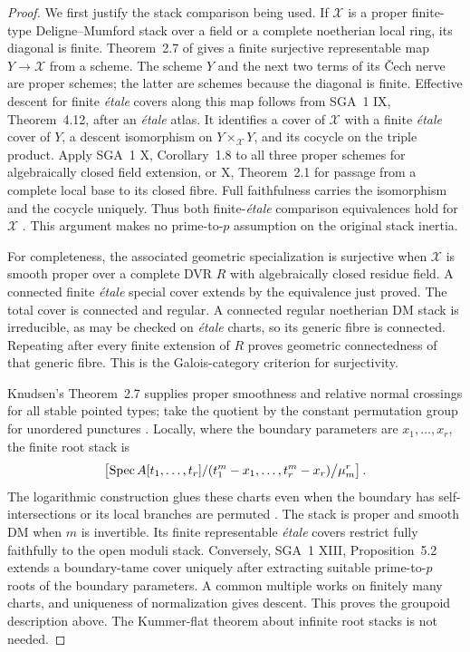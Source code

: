 \begin{proof}
We first justify the stack comparison being used. If $\mathcal X$ is
a proper finite-type Deligne--Mumford stack over a field or a complete
noetherian local ring, its diagonal is finite. Theorem~2.7 of
\citet{F_EHKV2001} gives a finite surjective representable map
$Y\to\mathcal X$ from a scheme. The scheme $Y$ and the next two
terms of its \v Cech nerve are proper schemes; the latter are schemes
because the diagonal is finite. Effective descent for finite
\emph{\'etale} covers along this map follows from SGA~1 IX,
Theorem~4.12, after an \emph{\'etale} atlas. It identifies a cover
of $\mathcal X$ with a finite \emph{\'etale} cover of $Y$, a
descent isomorphism on $Y\times_{\mathcal X}Y$, and its cocycle
on the triple product. Apply SGA~1 X, Corollary~1.8 to all three
proper schemes for algebraically closed field extension, or X,
Theorem~2.1 for passage from a complete local base to its closed
fibre. Full faithfulness carries the isomorphism and the cocycle
uniquely. Thus both finite-\emph{\'etale} comparison equivalences
hold for $\mathcal X$ \citep{E_SGA1}. This argument makes no
prime-to-$p$ assumption on the original stack inertia.

For completeness, the associated geometric specialization is
surjective when $\mathcal X$ is smooth proper over a complete DVR
$R$ with algebraically closed residue field. A connected finite
\emph{\'etale} special cover extends by the equivalence just
proved. The total cover is connected and regular. A connected
regular noetherian DM stack is irreducible, as may be checked on
\emph{\'etale} charts, so its generic fibre is connected.
Repeating after every finite extension of $R$ proves geometric
connectedness of that generic fibre. This is the Galois-category
criterion for surjectivity.

Knudsen's Theorem~2.7 supplies proper smoothness and relative normal
crossings for all stable pointed types; take the quotient by the
constant permutation group for unordered punctures
\citep[p.~179]{BC_Knudsen}. Locally, where the boundary parameters
are $x_1,\ldots,x_r$, the finite root stack is
\[
 \left[\operatorname{Spec}
 A[t_1,\ldots,t_r]/(t_1^m-x_1,\ldots,t_r^m-x_r)
       \big/\mu_m^r\right].
\]
The logarithmic construction glues these charts even when the
boundary has self-intersections or its local branches are permuted
\citep[Propositions~3.4 and 3.10]{F_TalpoVistoli2018}.
The stack is proper and smooth DM when $m$ is invertible. Its
finite representable \emph{\'etale} covers restrict fully faithfully
to the open moduli stack. Conversely, SGA~1 XIII, Proposition~5.2
extends a boundary-tame cover uniquely after extracting suitable
prime-to-$p$ roots of the boundary parameters. A common multiple
works on finitely many charts, and uniqueness of normalization
gives descent. This proves the groupoid description above. The
Kummer-flat theorem about infinite root stacks is not needed.


\end{proof}
